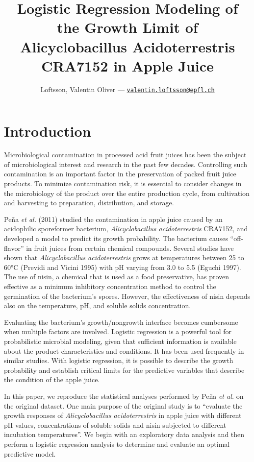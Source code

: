 \documentclass[
  12pt,
]{article}
\title{\vspace{-2cm} Logistic Regression Modeling of the Growth Limit of
Alicyclobacillus Acidoterrestris CRA7152 in Apple Juice}
\author{Loftsson, Valentin Oliver ---
\href{mailto:valentin.loftsson@epfl.ch}{\nolinkurl{valentin.loftsson@epfl.ch}}}
\date{}
\begin{document}
\maketitle

\hypertarget{introduction}{%
\section{Introduction}\label{introduction}}

Microbiological contamination in processed acid fruit juices has been
the subject of microbiological interest and research in the past few
decades. Controlling such contamination is an important factor in the
preservation of packed fruit juice products. To minimize contamination
risk, it is essential to consider changes in the microbiology of the
product over the entire production cycle, from cultivation and
harvesting to preparation, distribution, and storage.

Peña \emph{et al.} (2011) studied the contamination in apple juice
caused by an acidophilic sporeformer bacterium, \emph{Alicyclobacillus
acidoterrestris} CRA7152, and developed a model to predict its growth
probability. The bacterium causes ``off-flavor'' in fruit juices from
certain chemical compounds. Several studies have shown that
\emph{Alicyclobacillus acidoterrestris} grows at temperatures between 25
to 60°C (Previdi and Vicini 1995) with pH varying from 3.0 to 5.5
(Eguchi 1997). The use of nisin, a chemical that is used as a food
preservative, has proven effective as a minimum inhibitory concentration
method to control the germination of the bacterium's spores. However,
the effectiveness of nisin depends also on the temperature, pH, and
soluble solids concentration.

Evaluating the bacterium's growth/nongrowth interface becomes cumbersome
when multiple factors are involved. Logistic regression is a powerful
tool for probabilistic microbial modeling, given that sufficient
information is available about the product characteristics and
conditions. It has been used frequently in similar studies. With
logistic regression, it is possible to describe the growth probability
and establish critical limits for the predictive variables that describe
the condition of the apple juice.

In this paper, we reproduce the statistical analyses performed by Peña
\emph{et al.} on the original dataset. One main purpose of the original
study is to ``evaluate the growth responses of \emph{Alicyclobacillus
acidoterrestris} in apple juice with different pH values, concentrations
of soluble solids and nisin subjected to different incubation
temperatures''. We begin with an exploratory data analysis and then
perform a logistic regression analysis to determine and evaluate an
optimal predictive model.
\end{document}
